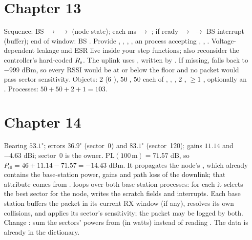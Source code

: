 \section*{Chapter 13}
 Sequence: BS  $\to$  $\to$  (node state); each ms  $\to$ ; if ready $\to$  $\to$ BS interrupt (buffer); end of window: BS .
 Provide , , , , an  process accepting , , . Voltage-dependent leakage and ESR live inside your step functions; also reconsider the controller's hard-coded $R_{\mathrm{s}}$.
 The uplink uses , written by . If missing,  falls back to $-999$ dBm, so every RSSI would be at or below the floor and no packet would pass sector sensitivity.
 Objects: $2$  ($6$ ), $50$ , $50$ each of , , , $2$ , $\ge1$ , optionally an . Processes: $50+50+2+1=103$.

\section*{Chapter 14}
 Bearing $53.1^\circ$; errors $36.9^\circ$ (sector~0) and $83.1^\circ$ (sector~120); gains $11.14$ and $-4.63$ dBi; sector~0 is the owner. $\mathrm{PL}(100\,\mathrm m)=71.57$ dB, so $P_{\mathrm{dl}}=46+11.14-71.57=-14.43$ dBm.
 It propagates the node's , which already contains the base-station power, gains and path loss of the downlink; that attribute comes from .
  loops over both base-station processes: for each it selects the best sector for the node, writes the scratch fields and interrupts. Each base station buffers the packet in its current RX window (if any), resolves its own collisions, and applies its sector's sensitivity; the packet may be logged by both.
 Change : sum the sectors' powers from  (in watts) instead of reading . The data is already in the dictionary.

